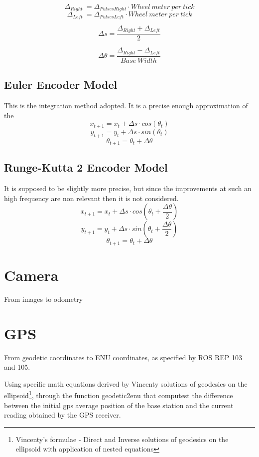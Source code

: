 $$
\Delta _{Right} ~ = \Delta _{PulsesRight} \cdot Wheel~meter~per~tick
$$
$$
\Delta _{Left} ~ = \Delta _{PulsesLeft} \cdot Wheel~meter~per~tick
$$

$$
\Delta s = \frac{\Delta _{Right} + \Delta _{Left}}{2}
$$


$$
\Delta {\theta} = \frac{\Delta _{Right} - \Delta _{Left}}{Base~Width}
$$

\subsection{Euler Encoder Model}

\noindent This is the integration method adopted. It is a precise enough approximation of the 
$$
x_{t+1} = x_t + \Delta s \cdot cos(\theta_t)
$$
$$
y_{t+1} = y_t + \Delta s \cdot sin(\theta_t)
$$
$$
\theta_{t+1} = \theta_t + \Delta {\theta}
$$

\subsection{Runge-Kutta 2 Encoder Model}

\noindent It is supposed to be slightly more precise, but since the improvements at such an high frequency are non relevant then it is not considered.
$$
x_{t+1} = x_t + \Delta s \cdot cos(\theta_t + \frac{\Delta{\theta}}{2} )
$$
$$
y_{t+1} = y_t + \Delta s \cdot sin(\theta_t + \frac{\Delta{\theta}}{2} )
$$
$$
\theta_{t+1} = \theta_t + \Delta {\theta}
$$




\section{Camera}
\noindent
From images to odometry



\section{GPS}
\noindent
From geodetic coordinates to ENU coordinates, as specified by ROS REP 103 and 105.

Using  specific math equations derived by Vincenty solutions of geodesics on the ellipsoid\footnote{Vincenty's formulae  -  Direct and Inverse solutions of geodesics on the ellipsoid with application of nested equations}, through the function geodetic2enu that computest the difference between the initial gps average position of the base station and the current reading obtained by the GPS receiver.

